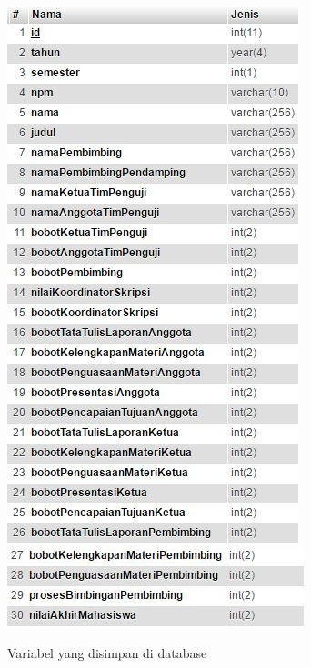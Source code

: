 \documentclass[a4paper,twoside]{article}
\begin{document}
\begin{enumerate}
			\begin{figure}[H]
				\centering
				\includegraphics[scale=1]{Gambar/database1}
				\linebreak
				\includegraphics[scale=1]{Gambar/database2}
				\caption{Variabel yang disimpan di database}
				\label{fig:database}
			\end{figure}
		

\end{enumerate}
\end{document}
